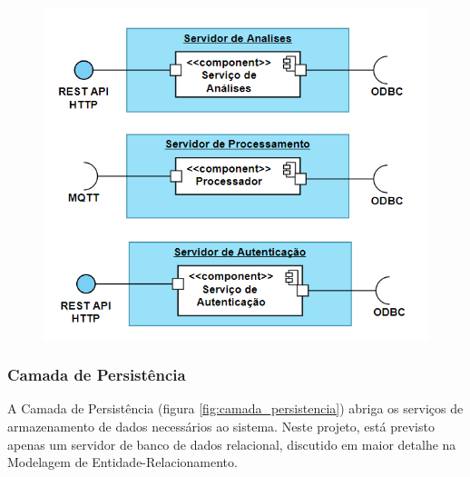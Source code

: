 \begin{figure}[H]
    \centering
    \includegraphics[scale=0.50]{figuras/projeto/software/camada_negocios.PNG}
    \label{fig:camada_negocios}
\end{figure}

\subsubsection{Camada de Persistência}

A Camada de Persistência (figura \ref{fig:camada_persistencia}) abriga os serviços de armazenamento de dados necessários ao sistema. Neste projeto, está previsto apenas um servidor de banco de dados relacional, discutido em maior detalhe na Modelagem de Entidade-Relacionamento.

